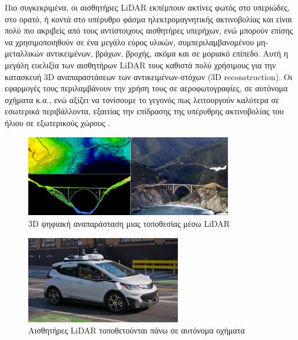 Πιο συγκεκριμένα, οι αισθητήρες LiDAR εκπέμπουν ακτίνες φωτός στο υπεριώδες, στο ορατό, ή κοντά στο υπέρυθρο φάσμα ηλεκτρομαγνητικής ακτινοβολίας και είναι πολύ πιο ακριβείς από τους αντίστοιχους αισθητήρες υπερήχων, ενώ μπορούν επίσης να χρησιμοποιηθούν σε ένα μεγάλο εύρος υλικών, συμπεριλαμβανομένου μη-μεταλλικών αντικειμένων, βράχων, βροχής, ακόμα και σε μοριακό επίπεδο. Αυτή η μεγάλη ευελιξία των αισθητήρων LiDAR τους καθιστά πολύ χρήσιμους για την κατασκευή 3D αναπαραστάσεων των αντικειμένων-στόχων (3D reconstruction). Οι εφαρμογές τους περιλαμβάνουν την χρήση τους σε αεροφωτογραφίες, σε αυτόνομα οχήματα κ.α., ενώ αξίζει να τονίσουμε το γεγονός πως λειτουργούν καλύτερα σε εσωτερικά περιβάλλοντα, εξαιτίας την επίδρασης της υπέρυθρης ακτινοβολίας του ήλιου σε εξωτερικούς χώρους \cite{wiki:lidar}.

\begin{figure}[H]
    \centering
    \includegraphics[width=0.8\textwidth]{images/lidar_3d_map.jpg}
    \caption{3D ψηφιακή αναπαράσταση μιας τοποθεσίας μέσω LiDAR}
    \label{fig:lidar-3dmap}
\end{figure}
\hspace{1cm}
\begin{figure}[H]
    \centering
    \includegraphics[width=0.6\textwidth]{images/lidar_car.jpg}
    \caption{Αισθητήρες LiDAR τοποθετούνται πάνω σε αυτόνομα οχήματα}
    \label{fig:lidar-car}
\end{figure}
\hspace{1cm}
